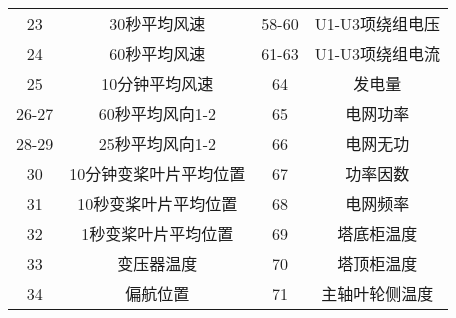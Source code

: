 {\begin{table}[H]
{{\begin{tabular}{cccc}
23    & 30秒平均风速      & 58-60 & U1-U3项绕组电压   \\
24    & 60秒平均风速      & 61-63 & U1-U3项绕组电流   \\
25    & 10分钟平均风速     & 64    & 发电量          \\
26-27 & 60秒平均风向1-2   & 65    & 电网功率         \\
28-29 & 25秒平均风向1-2   & 66    & 电网无功         \\
30    & 10分钟变桨叶片平均位置 & 67    & 功率因数         \\
31    & 10秒变桨叶片平均位置  & 68    & 电网频率         \\
32    & 1秒变桨叶片平均位置   & 69    & 塔底柜温度        \\
33    & 变压器温度        & 70    & 塔顶柜温度        \\
34    & 偏航位置         & 71    & 主轴叶轮侧温度      \\
        \bottomrule%
        \end{tabular}}}
        \end{table}
    
}
